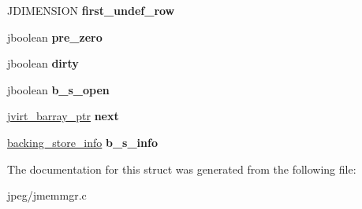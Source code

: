 \begin{DoxyCompactItemize}
\item 
J\+D\+I\+M\+E\+N\+S\+I\+ON {\bfseries first\+\_\+undef\+\_\+row}\hypertarget{structjvirt__barray__control_aa4bba1a9fc9dfdbb43d926f27016bb08}{}\label{structjvirt__barray__control_aa4bba1a9fc9dfdbb43d926f27016bb08}

\item 
jboolean {\bfseries pre\+\_\+zero}\hypertarget{structjvirt__barray__control_a290c2133b31578569db6141da5cc98a4}{}\label{structjvirt__barray__control_a290c2133b31578569db6141da5cc98a4}

\item 
jboolean {\bfseries dirty}\hypertarget{structjvirt__barray__control_a2f9d2edde9d9fae4f491a8e46986f9bc}{}\label{structjvirt__barray__control_a2f9d2edde9d9fae4f491a8e46986f9bc}

\item 
jboolean {\bfseries b\+\_\+s\+\_\+open}\hypertarget{structjvirt__barray__control_a922cdc440c19a456a29e288fc4584f7e}{}\label{structjvirt__barray__control_a922cdc440c19a456a29e288fc4584f7e}

\item 
\hyperlink{structjvirt__barray__control}{jvirt\+\_\+barray\+\_\+ptr} {\bfseries next}\hypertarget{structjvirt__barray__control_ae4b8dea777dcac10f1de982f0bedac0e}{}\label{structjvirt__barray__control_ae4b8dea777dcac10f1de982f0bedac0e}

\item 
\hyperlink{structbacking__store__struct}{backing\+\_\+store\+\_\+info} {\bfseries b\+\_\+s\+\_\+info}\hypertarget{structjvirt__barray__control_a6b33df0220c0545b4d7c7a8563a7fb18}{}\label{structjvirt__barray__control_a6b33df0220c0545b4d7c7a8563a7fb18}

\end{DoxyCompactItemize}


The documentation for this struct was generated from the following file\+:\begin{DoxyCompactItemize}
\item 
jpeg/jmemmgr.\+c\end{DoxyCompactItemize}

